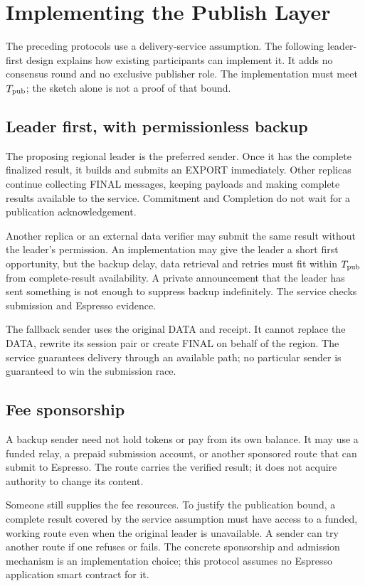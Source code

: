 \documentclass[11pt,a4paper]{article}
\newcounter{protocol}
\begin{document}
\section{Implementing the Publish Layer}
\label{sec:publish-implementation}
The preceding protocols use a delivery-service assumption. The following
leader-first design explains how existing participants can implement it.
It adds no consensus round and no exclusive publisher role.
The implementation must meet $T_{\rm pub}$; the sketch alone is not a
proof of that bound.

\subsection{Leader first, with permissionless backup}
The proposing regional leader is the preferred sender. Once it has the
complete finalized result, it builds and submits an EXPORT immediately.
Other replicas continue collecting FINAL messages, keeping payloads and
making complete results available to the service. Commitment and
Completion do not wait for a publication acknowledgement.

Another replica or an external data verifier may submit the same result
without the leader's permission. An implementation may give the leader a
short first opportunity, but the backup delay, data retrieval and retries
must fit within $T_{\rm pub}$ from complete-result availability. A private
announcement that the leader has sent something is not enough to suppress
backup indefinitely. The service checks submission and Espresso evidence.

The fallback sender uses the original DATA and receipt. It cannot replace
the DATA, rewrite its session pair or create FINAL on behalf of the region.
The service guarantees delivery through an available path; no particular
sender is guaranteed to win the submission race.

\subsection{Fee sponsorship}
A backup sender need not hold tokens or pay from its own balance. It may
use a funded relay, a prepaid submission account, or another sponsored
route that can submit to Espresso. The route carries the verified result;
it does not acquire authority to change its content.

Someone still supplies the fee resources. To justify the publication
bound, a complete result covered by the service assumption must have access to a funded,
working route even when the original leader is unavailable. A sender can
try another route if one refuses or fails. The concrete sponsorship and
admission mechanism is an implementation choice; this protocol assumes
no Espresso application smart contract for it.
\end{document}

